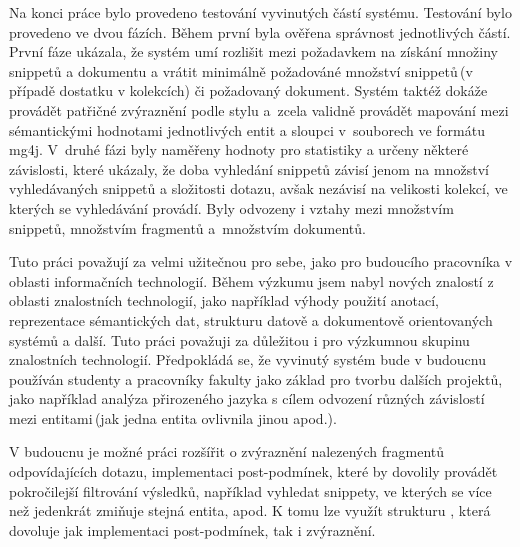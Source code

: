Na konci práce bylo provedeno testování vyvinutých částí systému. Testování bylo provedeno ve dvou fázích. Během první byla ověřena správnost jednotlivých částí. První fáze ukázala, že systém umí rozlišit mezi požadavkem na získání množiny snippetů a dokumentu a vrátit minimálně požadováné množství snippetů\,(v případě dostatku v kolekcích) či požadovaný dokument. Systém taktéž dokáže provádět patřičné zvýraznění podle stylu a~zcela validně provádět mapování mezi sémantickými hodnotami jednotlivých entit a sloupci v~souborech ve formátu mg4j. V~druhé fázi byly naměřeny hodnoty pro statistiky a určeny některé závislosti, které ukázaly, že doba vyhledání snippetů závisí jenom na množství vyhledávaných snippetů a složitosti dotazu, avšak nezávisí na velikosti kolekcí, ve kterých se vyhledávání provádí. Byly odvozeny i vztahy mezi množstvím snippetů, množstvím fragmentů a~množstvím dokumentů. 


Tuto práci považují za velmi užitečnou pro sebe, jako pro budoucího pracovníka v oblasti informačních technologií. Během výzkumu jsem nabyl nových znalostí z oblasti znalostních technologií, jako například výhody použití anotací, reprezentace sémantických dat, strukturu datově a dokumentově orientovaných systémů a další. Tuto práci považuji za důležitou i pro výzkumnou skupinu znalostních technologií. Předpokládá se, že vyvinutý systém bude v budoucnu používán studenty a pracovníky fakulty jako základ pro tvorbu dalších projektů, jako například analýza přirozeného jazyka s cílem odvození různých závislostí mezi entitami\,(jak jedna entita ovlivnila jinou apod.).


V budoucnu je možné práci rozšířit o zvýraznění nalezených fragmentů odpovídajících dotazu, implementaci post-podmínek, které by dovolily provádět pokročilejší filtrování výsledků, například vyhledat snippety, ve kterých se více než jedenkrát zmiňuje stejná entita, apod. K tomu lze využít strukturu , která dovoluje jak implementaci post-podmínek, tak i zvýraznění. 



